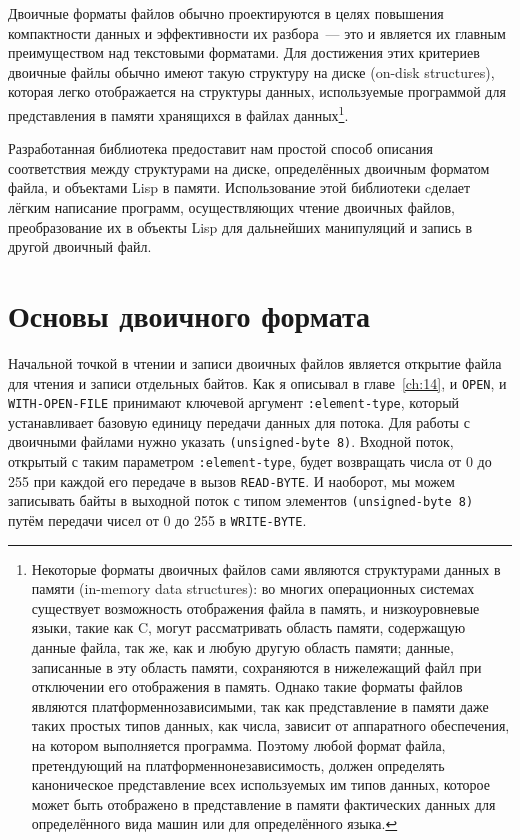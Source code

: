 Двоичные форматы файлов обычно проектируются в целях повышения компактности данных и
эффективности их разбора~--- это и является их главным преимуществом над текстовыми
форматами. Для достижения этих критериев двоичные файлы обычно имеют такую структуру на
диске (on-disk structures), которая легко отображается на структуры данных, используемые
программой для представления в памяти хранящихся в файлах данных\footnote{Некоторые
  форматы двоичных файлов сами являются структурами данных в памяти (in-memory data
  structures): во многих операционных системах существует возможность отображения файла в
  память, и низкоуровневые языки, такие как C, могут рассматривать область памяти,
  содержащую данные файла, так же, как и любую другую область памяти; данные, записанные в
  эту область памяти, сохраняются в нижележащий файл при отключении его отображения в
  память. Однако такие форматы файлов являются платформеннозависимыми, так как
  представление в памяти даже таких простых типов данных, как числа, зависит от
  аппаратного обеспечения, на котором выполняется программа. Поэтому любой формат файла,
  претендующий на платформеннонезависимость, должен определять каноническое представление
  всех используемых им типов данных, которое может быть отображено в представление в
  памяти фактических данных для определённого вида машин или для определённого языка.}.

Разработанная библиотека предоставит нам простой способ описания соответствия между
структурами на диске, определённых двоичным форматом файла, и объектами Lisp в
памяти. Использование этой библиотеки cделает лёгким написание программ, осуществляющих
чтение двоичных файлов, преобразование их в объекты Lisp для дальнейших манипуляций и
запись в другой двоичный файл.

\section{Основы двоичного формата}

Начальной точкой в чтении и записи двоичных файлов является открытие файла для чтения и
записи отдельных байтов. Как я описывал в главе~\ref{ch:14}, и \lstinline{OPEN}, и
\lstinline{WITH-OPEN-FILE} принимают ключевой аргумент \lstinline{:element-type}, который
устанавливает базовую единицу передачи данных для потока. Для работы с двоичными файлами
нужно указать \lstinline{(unsigned-byte 8)}. Входной поток, открытый с таким параметром
\lstinline{:element-type}, будет возвращать числа от 0 до 255 при каждой его передаче в вызов
\lstinline{READ-BYTE}. И наоборот, мы можем записывать байты в выходной поток с типом
элементов \lstinline{(unsigned-byte 8)} путём передачи чисел от 0 до 255 в \lstinline{WRITE-BYTE}.

